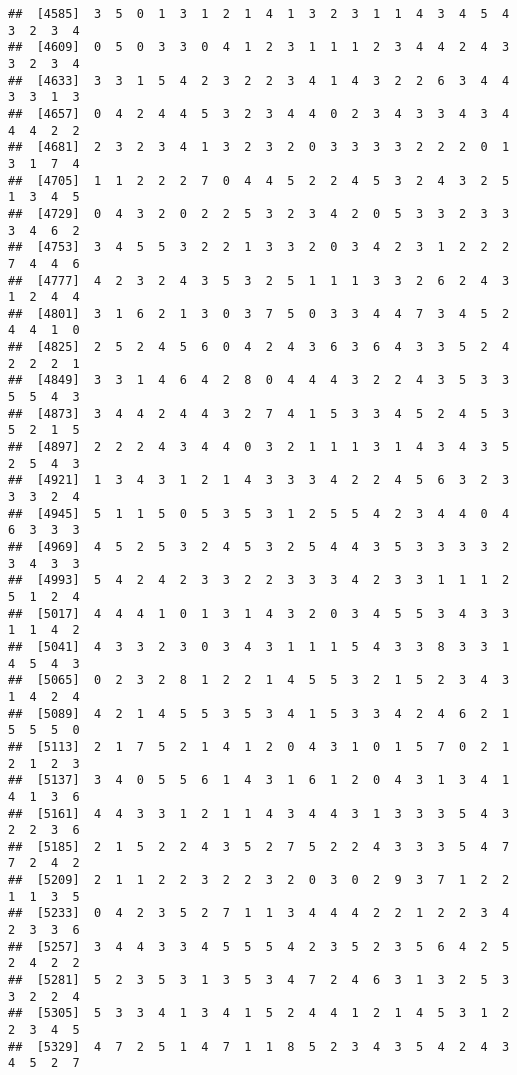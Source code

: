 \documentclass[
]{article}
\begin{document}
\begin{verbatim}
##  [4585]  3  5  0  1  3  1  2  1  4  1  3  2  3  1  1  4  3  4  5  4  3  2  3  4
##  [4609]  0  5  0  3  3  0  4  1  2  3  1  1  1  2  3  4  4  2  4  3  3  2  3  4
##  [4633]  3  3  1  5  4  2  3  2  2  3  4  1  4  3  2  2  6  3  4  4  3  3  1  3
##  [4657]  0  4  2  4  4  5  3  2  3  4  4  0  2  3  4  3  3  4  3  4  4  4  2  2
##  [4681]  2  3  2  3  4  1  3  2  3  2  0  3  3  3  3  2  2  2  0  1  3  1  7  4
##  [4705]  1  1  2  2  2  7  0  4  4  5  2  2  4  5  3  2  4  3  2  5  1  3  4  5
##  [4729]  0  4  3  2  0  2  2  5  3  2  3  4  2  0  5  3  3  2  3  3  3  4  6  2
##  [4753]  3  4  5  5  3  2  2  1  3  3  2  0  3  4  2  3  1  2  2  2  7  4  4  6
##  [4777]  4  2  3  2  4  3  5  3  2  5  1  1  1  3  3  2  6  2  4  3  1  2  4  4
##  [4801]  3  1  6  2  1  3  0  3  7  5  0  3  3  4  4  7  3  4  5  2  4  4  1  0
##  [4825]  2  5  2  4  5  6  0  4  2  4  3  6  3  6  4  3  3  5  2  4  2  2  2  1
##  [4849]  3  3  1  4  6  4  2  8  0  4  4  4  3  2  2  4  3  5  3  3  5  5  4  3
##  [4873]  3  4  4  2  4  4  3  2  7  4  1  5  3  3  4  5  2  4  5  3  5  2  1  5
##  [4897]  2  2  2  4  3  4  4  0  3  2  1  1  1  3  1  4  3  4  3  5  2  5  4  3
##  [4921]  1  3  4  3  1  2  1  4  3  3  3  4  2  2  4  5  6  3  2  3  3  3  2  4
##  [4945]  5  1  1  5  0  5  3  5  3  1  2  5  5  4  2  3  4  4  0  4  6  3  3  3
##  [4969]  4  5  2  5  3  2  4  5  3  2  5  4  4  3  5  3  3  3  3  2  3  4  3  3
##  [4993]  5  4  2  4  2  3  3  2  2  3  3  3  4  2  3  3  1  1  1  2  5  1  2  4
##  [5017]  4  4  4  1  0  1  3  1  4  3  2  0  3  4  5  5  3  4  3  3  1  1  4  2
##  [5041]  4  3  3  2  3  0  3  4  3  1  1  1  5  4  3  3  8  3  3  1  4  5  4  3
##  [5065]  0  2  3  2  8  1  2  2  1  4  5  5  3  2  1  5  2  3  4  3  1  4  2  4
##  [5089]  4  2  1  4  5  5  3  5  3  4  1  5  3  3  4  2  4  6  2  1  5  5  5  0
##  [5113]  2  1  7  5  2  1  4  1  2  0  4  3  1  0  1  5  7  0  2  1  2  1  2  3
##  [5137]  3  4  0  5  5  6  1  4  3  1  6  1  2  0  4  3  1  3  4  1  4  1  3  6
##  [5161]  4  4  3  3  1  2  1  1  4  3  4  4  3  1  3  3  3  5  4  3  2  2  3  6
##  [5185]  2  1  5  2  2  4  3  5  2  7  5  2  2  4  3  3  3  5  4  7  7  2  4  2
##  [5209]  2  1  1  2  2  3  2  2  3  2  0  3  0  2  9  3  7  1  2  2  1  1  3  5
##  [5233]  0  4  2  3  5  2  7  1  1  3  4  4  4  2  2  1  2  2  3  4  2  3  3  6
##  [5257]  3  4  4  3  3  4  5  5  5  4  2  3  5  2  3  5  6  4  2  5  2  4  2  2
##  [5281]  5  2  3  5  3  1  3  5  3  4  7  2  4  6  3  1  3  2  5  3  3  2  2  4
##  [5305]  5  3  3  4  1  3  4  1  5  2  4  4  1  2  1  4  5  3  1  2  2  3  4  5
##  [5329]  4  7  2  5  1  4  7  1  1  8  5  2  3  4  3  5  4  2  4  3  4  5  2  7

\end{verbatim}
\end{document}
